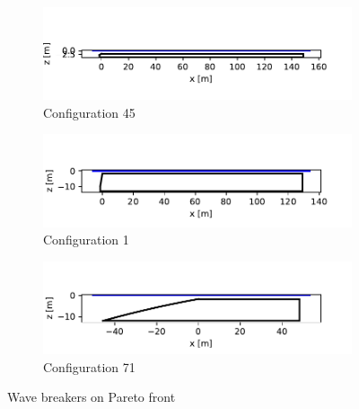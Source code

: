 \begin{figure}[h]
    \centering
    \begin{subfigure}[b]{0.49\textwidth}
        \centering
        \includegraphics[width=\linewidth]{figures/ComFLOW/Breakwater Geometries/Design Iteration 1 captive/general/breakwater_geometry45.pdf}
        \caption[]%
        {{\small Configuration 45}}    
        \label{}
    \end{subfigure}
    \hfill
    \begin{subfigure}[b]{0.49\textwidth}  
        \centering 
        \includegraphics[width=\linewidth]{figures/ComFLOW/Breakwater Geometries/Design Iteration 1 captive/general/breakwater_geometry1.pdf}
        \caption[]%
        {{\small Configuration 1}}    
        \label{}
    \end{subfigure}
    
    \centering
    \begin{subfigure}[b]{0.49\textwidth}
        \centering
        \includegraphics[width=\linewidth]{figures/ComFLOW/Breakwater Geometries/Design Iteration 1 captive/general/breakwater_geometry71.pdf}
        \caption[]%
        {{\small Configuration 71}}    
        \label{}
    \end{subfigure}
    
    \caption{Wave breakers on Pareto front}
    \label{fig: pareto front bw DI1 H3 captive}
\end{figure}




